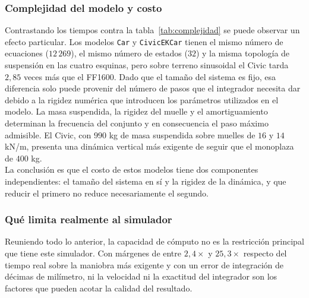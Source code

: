 \subsubsection{Complejidad del modelo y costo}


Contrastando los tiempos contra la tabla~\ref{tab:complejidad} se puede observar un efecto particular. Los modelos \verb|Car| y \verb|CivicEKCar| tienen el mismo número de ecuaciones ($12\,269$), el mismo número de estados ($32$) y la misma topología de suspensión en las cuatro esquinas, pero sobre terreno sinusoidal el Civic tarda $2{,}85$ veces más que el FF1600. Dado que el tamaño del sistema es fijo, esa diferencia solo puede provenir del número de pasos que el integrador necesita dar debido a la rigidez numérica que introducen los parámetros utilizados en el modelo. La masa suspendida, la rigidez del muelle y el amortiguamiento determinan la frecuencia del conjunto y en consecuencia el paso máximo admisible. El Civic, con $990$ kg de masa suspendida sobre muelles de $16$ y $14$ kN/m, presenta una dinámica vertical más exigente de seguir que el monoplaza de $400$ kg.\\

La conclusión es que el costo de estos modelos tiene dos componentes independientes: el tamaño del sistema en sí y la rigidez de la dinámica, y que reducir el primero no reduce necesariamente el segundo.


\subsubsection{Qué limita realmente al simulador}

Reuniendo todo lo anterior, la capacidad de cómputo no es la restricción principal que tiene este simulador. Con márgenes de entre $2{,}4\times$ y $25{,}3\times$ respecto del tiempo real sobre la maniobra más exigente y con un error de integración de décimas de milímetro, ni la velocidad ni la exactitud del integrador son los factores que pueden acotar la calidad del resultado.

